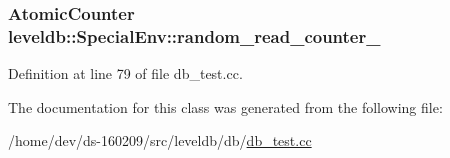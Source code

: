 \hypertarget{classleveldb_1_1_special_env_a7cf0b2e4dcd63460e8776ae3a2c70bee}{}
\subsubsection[{random\+\_\+read\+\_\+counter\+\_\+}]{\setlength{\rightskip}{0pt plus 5cm}Atomic\+Counter leveldb\+::\+Special\+Env\+::random\+\_\+read\+\_\+counter\+\_\+}\label{classleveldb_1_1_special_env_a7cf0b2e4dcd63460e8776ae3a2c70bee}


Definition at line 79 of file db\+\_\+test.\+cc.



The documentation for this class was generated from the following file\+:\begin{DoxyCompactItemize}
\item 
/home/dev/ds-\/160209/src/leveldb/db/\hyperlink{db__test_8cc}{db\+\_\+test.\+cc}\end{DoxyCompactItemize}
